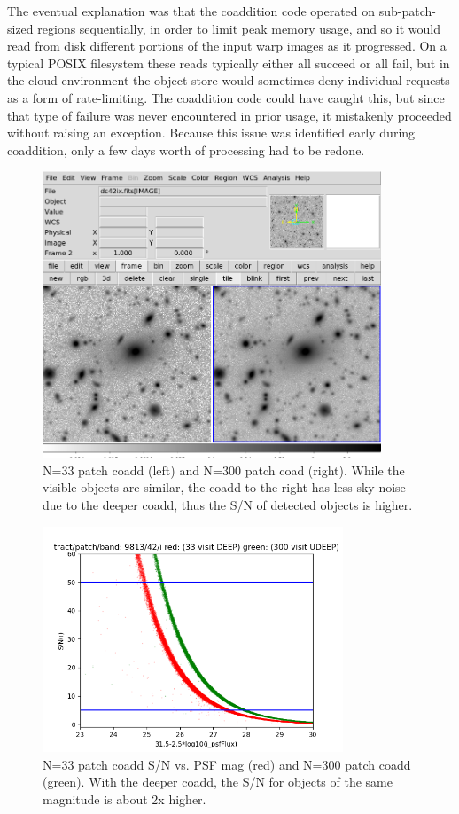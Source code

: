 The eventual explanation was that the coaddition code operated on sub-patch-sized regions
sequentially, in order to limit peak memory usage, and so it would read from disk different portions
of the input warp images as it progressed. On a typical POSIX filesystem these reads typically
either all succeed or all fail, but in the cloud environment the object store would sometimes deny
individual requests as a form of rate-limiting. The coaddition code could have caught this, but
since that type of failure was never encountered in prior usage, it mistakenly proceeded without
raising an exception. Because this issue was identified early during coaddition, only a few days
worth of processing had to be redone.


 \begin{figure}
 \includegraphics[width=0.9\textwidth]{sidebyside9813p42bi.png}
	 \caption{N=33 patch coadd (left) and N=300 patch coad (right).  While the visible objects are similar, the coadd to the right has less sky noise due to the deeper coadd, thus the S/N of detected objects is higher.  \label{fig:coadd}}
 \end{figure}

 \begin{figure}
 \includegraphics[width=0.8\textwidth,natwidth=600,natheight=600]{redgreen31.5.png}
	 \caption{N=33 patch coadd S/N vs. PSF mag (red) and N=300 patch coadd (green).  With the deeper coadd, the S/N for objects of the same magnitude is about 2x higher.  \label{fig:s2n}}
 \end{figure}

